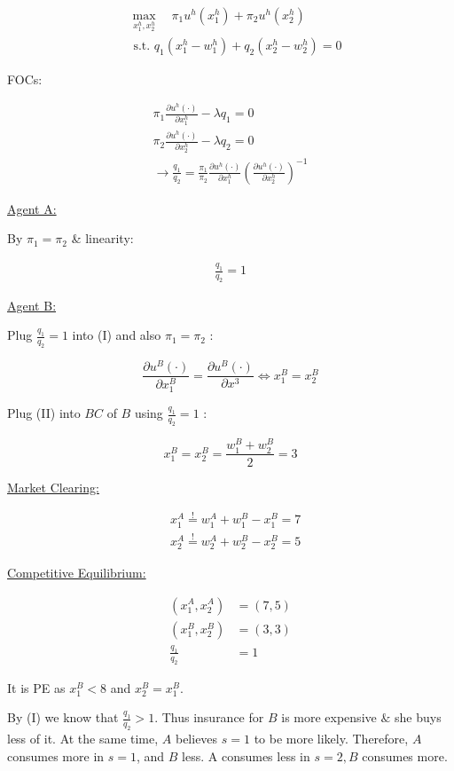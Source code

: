 {\begin{enumerate}[label=(\alph*)]
{$$
\begin{aligned}
& \max _{x_{1}^{h}, x_{2}^{h}} \quad \pi_{1} u^{h}\left(x_{1}^{h}\right)+\pi_{2} u^{h}\left(x_{2}^{h}\right) \\
& \text { s.t. } q_{1}\left(x_{1}^{h}-w_{1}^{h}\right)+q_{2}\left(x_{2}^{h}-w_{2}^{h}\right)=0
\end{aligned}
$$

FOCs:

\begin{align*}
    \pi_{1} \frac{\partial u^{h}(\cdot)}{\partial x_{1}^{h}}-\lambda q_{1}=0 \\
    \pi_{2} \frac{\partial u^{h}(\cdot)}{\partial x_{2}^{h}}-\lambda q_{2}=0 \\
    \longrightarrow \frac{q_{1}}{q_{2}}=\frac{\pi_{1}}{\pi_{2}} \frac{\partial u^{h}(\cdot)}{\partial x_{1}^{h}}\left(\frac{\partial u^{h}(\cdot)}{\partial x_{2}^{h}}\right)^{-1} \tag{I}
\end{align*}

\underline{Agent A:}

By $\pi_{1}=\pi_{2}$ \& linearity:

\begin{align*}
    \frac{q_{1}}{q_{2}}=1
\end{align*}

\underline{Agent B:}

Plug $\frac{q_{1}}{q_{2}}=1$ into (I) and also $\pi_{1}=\pi_{2}$ :

\begin{equation*}
    \frac{\partial u^{B}(\cdot)}{\partial x_{1}^{B}}=\frac{\partial u^{B}(\cdot)}{\partial x^{3}} \Leftrightarrow x_{1}^{B}=x_{2}^{B} \tag{II}
\end{equation*}

Plug (II) into $B C$ of $B$ using $\frac{q_{1}}{q_{2}}=1$ :

$$
x_{1}^{B}=x_{2}^{B}=\frac{w_{1}^{B}+w_{2}^{B}}{2}=3
$$

\underline{Market Clearing: }

$$
\begin{aligned}
& x_{1}^{A} \stackrel{!}{=} w_{1}^{A}+w_{1}^{B}-x_{1}^{B}=7 \\
& x_{2}^{A} \stackrel{!}{=} w_{2}^{A}+w_{2}^{B}-x_{2}^{B}=5
\end{aligned}
$$

\underline{Competitive Equilibrium: }

$$
\begin{aligned}
\left(x_{1}^{A}, x_{2}^{A}\right) & =(7,5) \\
\left(x_{1}^{B}, x_{2}^{B}\right) & =(3,3) \\
\frac{q_{1}}{q_2} & =1
\end{aligned}
$$

It is PE as $x_{1}^{B}<8$ and $x_{2}^{B}=x_{1}^{B}$.
}
{\item 
By (I) we know that $\frac{q_{1}}{q_{2}}>1$. Thus insurance for $B$ is more expensive $\&$ she buys less of it. At the same time, $A$ believes $s=1$ to be more likely. Therefore, $A$ consumes more in $s=1$, and $B$ less. A consumes less in $s=2, B$ consumes more.
}
\end{enumerate}
}